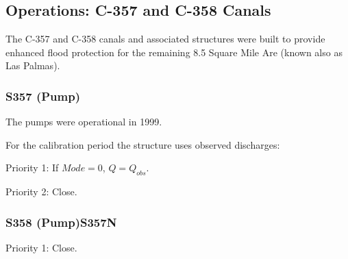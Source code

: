 

\clearpage
\subsection{Operations: C-357 and C-358 Canals}
The C-357 and C-358 canals and associated structures were built to provide enhanced flood protection for the remaining 8.5 Square Mile Are (known also as Las Palmas).

\subsubsection{S357  (Pump)}
The pumps were operational in 1999.

For the calibration period the structure uses observed discharges:

\begin{packed_items}
\item[]
\item Priority 1: If $Mode=0$, $Q = Q_{obs}$.
\item Priority 2: Close.
\end{packed_items}


\subsubsection{S358 (Pump)S357N}

\begin{packed_items}
\item Priority 1: Close.
\end{packed_items}

